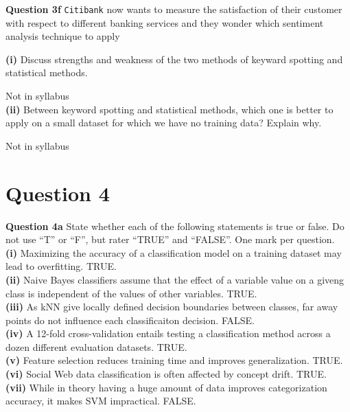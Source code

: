 \documentclass[11pt,a4paper]{report}
\begin{document}
\begin{multicols*}{2}
\noindent \textbf{Question 3f} \verb|Citibank| now wants to measure the satisfaction of their customer with respect to different banking services and they wonder which sentiment analysis technique to apply

\noindent \textbf{(i)} Discuss strengths and weakness of the two methods of keyward spotting and statistical methods. 

\noindent Not in syllabus\\

\noindent \textbf{(ii)} Between keyword spotting and statistical methods, which one is better to apply on a small dataset for which we have no training data? Explain why.

\noindent Not in syllabus

\section{Question 4}

\noindent \textbf{Question 4a} State whether each of the following statements is true or false. Do not use ``T'' or ``F'', but rater ``TRUE'' and ``FALSE''. One mark per question.\\

\noindent \textbf{(i)} Maximizing the accuracy of a classification model on a training dataset may lead to overfitting. TRUE.\\

\noindent \textbf{(ii)} Naive Bayes classifiers assume that the effect of a variable value on a giveng class is independent of the values of other variables. TRUE.\\

\noindent \textbf{(iii)} As kNN give locally defined decision boundaries between classes, far away points do not influence each classificaiton decision. FALSE.\\

\noindent \textbf{(iv)} A 12-fold cross-validation entails testing a classification method across a dozen different evaluation datasets. TRUE.\\

\noindent \textbf{(v)} Feature selection reduces training time and improves generalization. TRUE.\\

\noindent \textbf{(vi)} Social Web data classification is often affected by concept drift. TRUE.\\

\noindent \textbf{(vii)} While in theory having a huge amount of data improves categorization accuracy, it makes SVM impractical. FALSE.\\


\end{multicols*}
\end{document}
